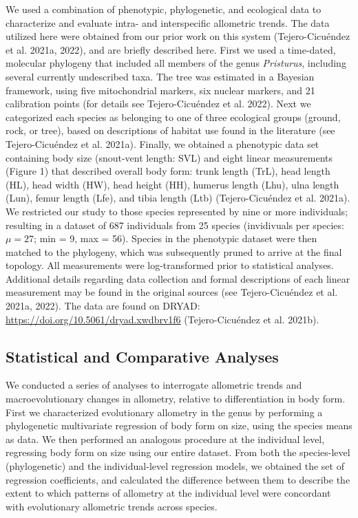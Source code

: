 \documentclass[
  11pt,
]{article}
\begin{document}
We used a combination of phenotypic, phylogenetic, and ecological data
to characterize and evaluate intra- and interspecific allometric trends.
The data utilized here were obtained from our prior work on this system
(Tejero-Cicuéndez et al. 2021a, 2022), and are briefly described here.
First we used a time-dated, molecular phylogeny that included all
members of the genus \emph{Pristurus}, including several currently
undescribed taxa. The tree was estimated in a Bayesian framework, using
five mitochondrial markers, six nuclear markers, and 21 calibration
points (for details see Tejero-Cicuéndez et al. 2022). Next we
categorized each species as belonging to one of three ecological groups
(ground, rock, or tree), based on descriptions of habitat use found in
the literature (see Tejero-Cicuéndez et al. 2021a). Finally, we obtained
a phenotypic data set containing body size (snout-vent length: SVL) and
eight linear measurements (Figure 1) that described overall body form:
trunk length (TrL), head length (HL), head width (HW), head height (HH),
humerus length (Lhu), ulna length (Lun), femur length (Lfe), and tibia
length (Ltb) (Tejero-Cicuéndez et al. 2021a). We restricted our study to
those species represented by nine or more individuals; resulting in a
dataset of 687 individuals from 25 species (invidivuals per species:
\(\mu=27\); min = 9, max = 56). Species in the phenotypic dataset were
then matched to the phylogeny, which was subsequently pruned to arrive
at the final topology. All measurements were log-transformed prior to
statistical analyses. Additional details regarding data collection and
formal descriptions of each linear measurement may be found in the
original sources (see Tejero-Cicuéndez et al. 2021a, 2022). The data are
found on DRYAD: \url{https://doi.org/10.5061/dryad.xwdbrv1f6}
(Tejero-Cicuéndez et al. 2021b).

\hypertarget{statistical-and-comparative-analyses}{%
\subsection{Statistical and Comparative
Analyses}\label{statistical-and-comparative-analyses}}

We conducted a series of analyses to interrogate allometric trends and
macroevolutionary changes in allometry, relative to differentiation in
body form. First we characterized evolutionary allometry in the genus by
performing a phylogenetic multivariate regression of body form on size,
using the species means as data. We then performed an analogous
procedure at the individual level, regressing body form on size using
our entire dataset. From both the species-level (phylogenetic) and the
individual-level regression models, we obtained the set of regression
coefficients, and calculated the difference between them to describe the
extent to which patterns of allometry at the individual level were
concordant with evolutionary allometric trends across species.
\hfill\break
\end{document}
